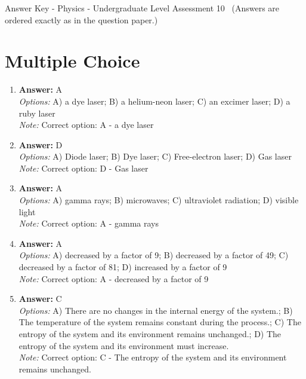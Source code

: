 \documentclass[12pt]{article}
\begin{document}
\begin{center}
Answer Key - Physics - Undergraduate Level Assessment 10 \
\small (Answers are ordered exactly as in the question paper.)
\end{center}

\section*{Multiple Choice}
\begin{enumerate}[label=\arabic*.]
\item \textbf{Answer:} A
\\ \textit{Options:} A) a dye laser; B) a helium-neon laser; C) an excimer laser; D) a ruby laser
\\ \textit{Note:} Correct option: A - a dye laser
\item \textbf{Answer:} D
\\ \textit{Options:} A) Diode laser; B) Dye laser; C) Free-electron laser; D) Gas laser
\\ \textit{Note:} Correct option: D - Gas laser
\item \textbf{Answer:} A
\\ \textit{Options:} A) gamma rays; B) microwaves; C) ultraviolet radiation; D) visible light
\\ \textit{Note:} Correct option: A - gamma rays
\item \textbf{Answer:} A
\\ \textit{Options:} A) decreased by a factor of 9; B) decreased by a factor of 49; C) decreased by a factor of 81; D) increased by a factor of 9
\\ \textit{Note:} Correct option: A - decreased by a factor of 9
\item \textbf{Answer:} C
\\ \textit{Options:} A) There are no changes in the internal energy of the system.; B) The temperature of the system remains constant during the process.; C) The entropy of the system and its environment remains unchanged.; D) The entropy of the system and its environment must increase.
\\ \textit{Note:} Correct option: C - The entropy of the system and its environment remains unchanged.
\end{enumerate}
\end{document}
